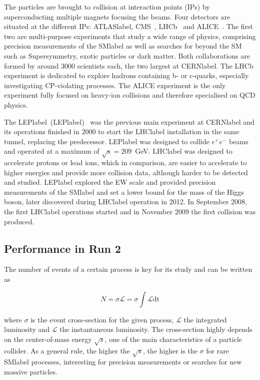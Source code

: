 The particles are brought to collision at interaction points (IPs) by superconducting multiple magnets focusing the beams. Four detectors are situated at the different IPs: \acrshort{ATLASlabel}, CMS~\cite{CMSmachine}, LHCb~\cite{LHCbmachine} and ALICE~\cite{ALICEmachine}. The first two are multi-purpose experiments that study a wide range of physics, comprising precision measurements of the \acrshort{SMlabel} as well as searches for beyond the SM such as Supersymmetry, exotic particles or dark matter. Both collaborations are formed by around 3000 scientists each, the two largest at \acrshort{CERNlabel}. The LHCb experiment is dedicated to explore hadrons containing b- or c-quarks, especially investigating CP-violating processes. The ALICE experiment is the only experiment fully focused on heavy-ion collisions and therefore specialised on QCD physics. 

The \acrlong{LEPlabel}~(\acrshort{LEPlabel})~\cite{LEPmachine} was the previous main experiment at \acrshort{CERNlabel} and its operations finished in 2000 to start the \acrshort{LHClabel} installation in the same tunnel, replacing the predecessor. \acrshort{LEPlabel} was designed to collide $e^+e^-$ beams and operated at a maximum of $\sqrt{\text{s}}=209$~GeV. \acrshort{LHClabel} was designed to accelerate protons or lead ions, which in comparison, are easier to accelerate to higher energies and provide more collision data, although harder to be detected and studied. \acrshort{LEPlabel} explored the \acrshort{EW} scale and provided precision measurements of the \acrshort{SMlabel} and set a lower bound for the mass of the Higgs boson, later discovered during \acrshort{LHClabel} operation in 2012. In September 2008, the first \acrshort{LHClabel} operations started and in November 2009 the first collision was produced. 

\subsection{Performance in Run 2}

The number of events of a certain process is key for its study and can be written as

\begin{equation}
    N = \sigma\mathscr{L} = \sigma \int \mathcal{L} \text{dt}
\end{equation}

where $\sigma$ is the event cross-section for the given process, $\mathscr{L}$ the integrated luminosity and $\mathcal{L}$ the instantaneous luminosity. The cross-section highly depends on the center-of-mass energy $\sqrt{s}$, one of the main characteristics of a particle collider. As a general rule, the higher the $\sqrt{s}$, the higher is the $\sigma$ for rare \acrshort{SMlabel} processes, interesting for precision measurements or searches for new massive particles.

